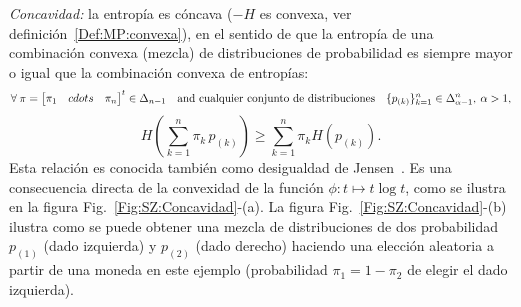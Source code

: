 \begin{propiedades}
  \begin{figure}[h!]
  \begin{center}  \end{center}
  \label{Fig:SZ:Recursividad}
  \end{figure}
%
\setcounter{PropConcavidad}{\value{enumi}}
\item\label{Prop:SZ:concavidad}  {\it Concavidad:}  la  entrop\'ia es  c\'oncava
  ($-H$ es convexa, ver definici\'on~\ref{Def:MP:convexa}),
  en el  sentido de que la  entrop\'ia de una combinaci\'on  convexa (mezcla) de
  distribuciones de probabilidad  es siempre mayor o igual  que la combinaci\'on
  convexa de entrop\'ias:
  \[
  \forall      \:     \pi      =     \begin{bmatrix}      \pi_1     &      cdots
  & \pi_n \end{bmatrix}^t \in \Delta_{n-1}
  \quad \mbox{and  cualquier  conjunto de  distribuciones} \quad  \{
  p_{(k)} \}_{k=1}^n \in \Delta_{\alpha-1}^n, \: \alpha > 1,
  \]
  \[
  H\left( \sum_{k=1}^n \pi_k \, p_{(k)} \right) \ge \sum_{k=1}^n \pi_k H(p_{(k)}).
  \]
  Esta relaci\'on es conocida tambi\'en como desigualdad de Jensen~\cite{Jen06}.
  Es una consecuencia directa de la  convexidad de la funci\'on $\phi: t \mapsto
  t \log  t$, como se ilustra en la  figura Fig.~\ref{Fig:SZ:Concavidad}-(a).  La
  figura  Fig.~\ref{Fig:SZ:Concavidad}-(b)  ilustra como  se  puede obtener  una
  mezcla  de distribuciones  de dos  probabilidad $p_{(1)}$  (dado  izquierda) y
  $p_{(2)}$ (dado  derecho) haciendo  una elecci\'on aleatoria  a partir  de una
  moneda en  este ejemplo (probabilidad  $\pi_1 = 1  - \pi_2$ de elegir  el dado
  izquierda).\newline
  \begin{figure}[h!]
  \begin{center}  \end{center}
\end{figure}
\end{propiedades}
